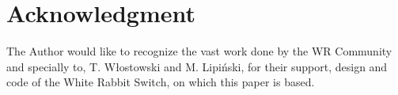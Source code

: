 \section{Acknowledgment}
The Author would like to recognize the vast work done by the WR Community 
and specially to, T. W\l{}ostowski and M. Lipiński, for their support,  
design and code of the White Rabbit Switch, on which this paper is based.


